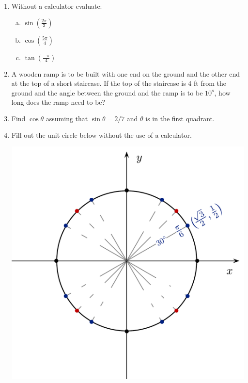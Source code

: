 \documentclass[11pt,fleqn]{article}
\begin{document}
\begin{enumerate}
\item Without a calculator evaluate:
  \begin{multicols}{3}{
      \vspace*{-0.45in}
      \begin{enumerate}[(a)]
      \item $\sin (\frac{2 \pi}{3} )$
      \item $\cos( \frac{5 \pi}{4} )$
      \item $\tan(\frac{- \pi}4 )$
      \end{enumerate}}
  \end{multicols}
 \vspace{1in}
\item A wooden ramp is to be built with one end on the ground and the other end at the top of a short staircase. If the top of the staircase is  4 ft from the ground and the angle between the ground and the ramp is to be $10^o$,  how long does the ramp need to be?\\
\vfill
\newpage
\item Find $\cos \theta$ assuming that $\sin \theta = 2/7$ and $\theta$ is in the first quadrant.
\vspace{2in}
\item Fill out the unit circle below without the use of a calculator.

\includegraphics[scale=.6]{blank-unit-circle}
\end{enumerate}
\end{document}
